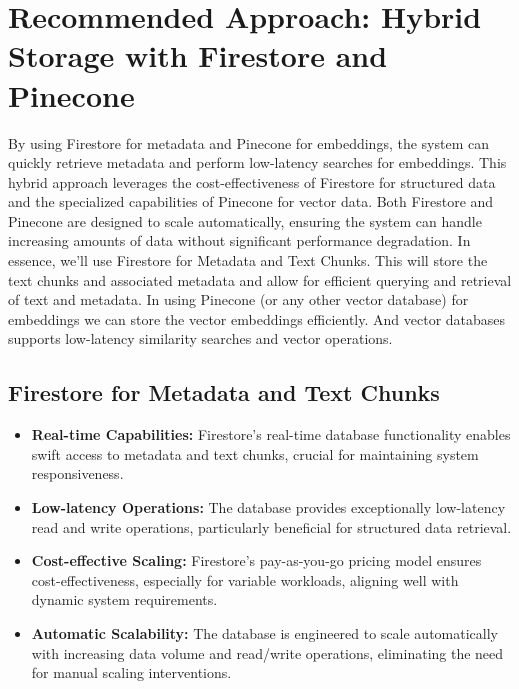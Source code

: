 \documentclass[a4paper, 12pt]{report}
\begin{document}
\section{Recommended Approach: Hybrid Storage with Firestore and Pinecone}

By using Firestore for metadata and Pinecone for embeddings, the system can quickly retrieve metadata and perform low-latency searches for embeddings. This hybrid approach leverages the cost-effectiveness of Firestore for structured data and the specialized capabilities of Pinecone for vector data. Both Firestore and Pinecone are designed to scale automatically, ensuring the system can handle increasing amounts of data without significant performance degradation. In essence, we'll use Firestore for Metadata and Text Chunks. This will store the text chunks and associated metadata and allow for efficient querying and retrieval of text and metadata. In using Pinecone (or any other vector database) for embeddings we can store the vector embeddings efficiently. And vector databases supports low-latency similarity searches and vector operations.

\subsection{Firestore for Metadata and Text Chunks}
\begin{itemize}
    \item \textbf{Real-time Capabilities:} Firestore's real-time database functionality enables swift access to metadata and text chunks, crucial for maintaining system responsiveness.
    \item \textbf{Low-latency Operations:} The database provides exceptionally low-latency read and write operations, particularly beneficial for structured data retrieval.
    \item \textbf{Cost-effective Scaling:} Firestore's pay-as-you-go pricing model ensures cost-effectiveness, especially for variable workloads, aligning well with dynamic system requirements.
    \item \textbf{Automatic Scalability:} The database is engineered to scale automatically with increasing data volume and read/write operations, eliminating the need for manual scaling interventions.
\end{itemize}
\end{document}
